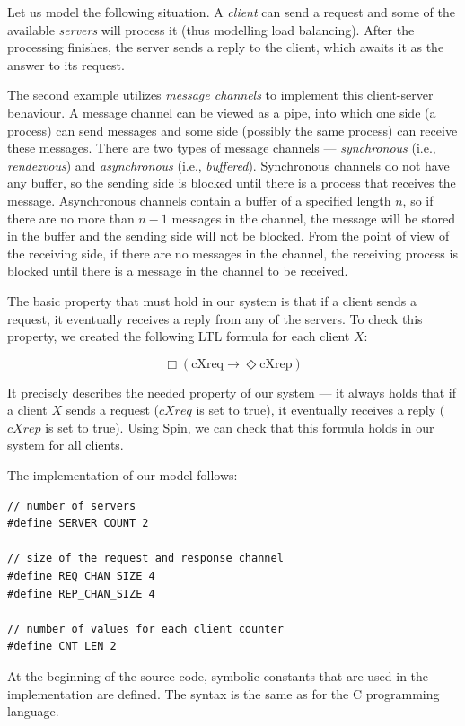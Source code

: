 Let us model the following situation. A \emph{client} can send a request and some of the available \emph{servers} will process it (thus modelling load balancing). After the processing finishes, the server sends a reply to the client, which awaits it as the answer to its request.

The second example utilizes \emph{message channels} to implement this client-server behaviour. A message channel can be viewed as a pipe, into which one side (a process) can send messages and some side (possibly the same process) can receive these messages. There are two types of message channels --- \emph{synchronous} (i.e., \emph{rendezvous}) and \emph{asynchronous} (i.e., \emph{buffered}). Synchronous channels do not have any buffer, so the sending side is blocked until there is a process that receives the message. Asynchronous channels contain a buffer of a specified length $n$, so if there are no more than $n-1$ messages in the channel, the message will be stored in the buffer and the sending side will not be blocked. From the point of view of the receiving side, if there are no messages in the channel, the receiving process is blocked until there is a message in the channel to be received.

The basic property that must hold in our system is that if a client sends a request, it eventually receives a reply from any of the servers. To check this property, we created the following LTL formula for each client $X$:

$$\Box(\mathrm{cXreq} \rightarrow \Diamond \mathrm{cXrep})$$

It precisely describes the needed property of our system --- it always holds that if a client $X$ sends a request ($cXreq$ is set to true), it eventually receives a reply ($cXrep$ is set to true). Using Spin, we can check that this formula holds in our system for all clients.

The implementation of our model follows:

\begin{lstlisting}[name=example2_listing]
// number of servers
#define SERVER_COUNT 2

// size of the request and response channel
#define REQ_CHAN_SIZE 4
#define REP_CHAN_SIZE 4

// number of values for each client counter
#define CNT_LEN 2
\end{lstlisting}

At the beginning of the source code, symbolic constants that are used in the implementation are defined. The syntax is the same as for the C programming language.

